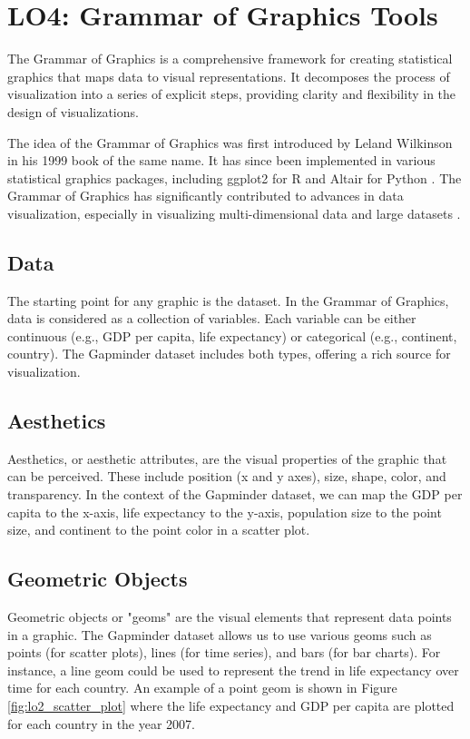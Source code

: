 \section{LO4: Grammar of Graphics Tools}

The Grammar of Graphics is a comprehensive framework for creating statistical graphics that maps data to visual representations. It decomposes the process of visualization into a series of explicit steps, providing clarity and flexibility in the design of visualizations.

The idea of the Grammar of Graphics was first introduced by Leland Wilkinson in his 1999 book of the same name. It has since been implemented in various statistical graphics packages, including ggplot2 for R and Altair for Python \cite{wilkinsonGrammarGraphics2005, wickhamLayeredGrammarGraphics2010,valero-moraGgplot2ElegantGraphics2010}. The Grammar of Graphics has significantly contributed to advances in data visualization, especially in visualizing multi-dimensional data and large datasets \cite{meyerVisualizationData2000}.

\subsection{Data}
The starting point for any graphic is the dataset. In the Grammar of Graphics, data is considered as a collection of variables. Each variable can be either continuous (e.g., GDP per capita, life expectancy) or categorical (e.g., continent, country). The Gapminder dataset includes both types, offering a rich source for visualization.

\subsection{Aesthetics}
Aesthetics, or aesthetic attributes, are the visual properties of the graphic that can be perceived. These include position (x and y axes), size, shape, color, and transparency. In the context of the Gapminder dataset, we can map the GDP per capita to the x-axis, life expectancy to the y-axis, population size to the point size, and continent to the point color in a scatter plot.

\subsection{Geometric Objects}
Geometric objects or "geoms" are the visual elements that represent data points in a graphic. The Gapminder dataset allows us to use various geoms such as points (for scatter plots), lines (for time series), and bars (for bar charts). For instance, a line geom could be used to represent the trend in life expectancy over time for each country.
An example of a point geom is shown in Figure \ref{fig:lo2_scatter_plot} where the life expectancy and GDP per capita are plotted for each country in the year 2007.

